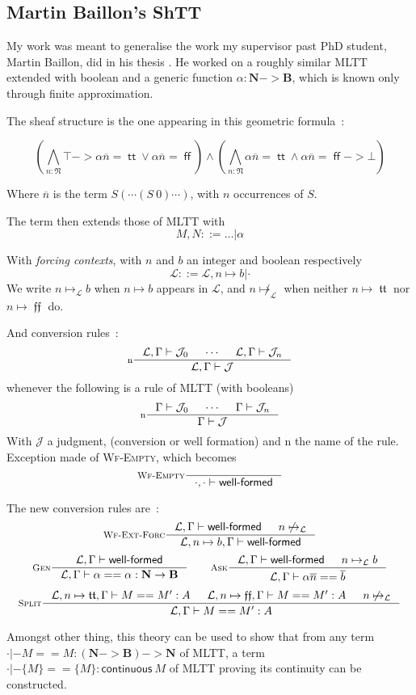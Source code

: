 \documentclass[11pt]{article}
\DeclareMathOperator{\true}{\mathsf{tt}}
\DeclareMathOperator{\false}{\mathsf{ff}}
\DeclareMathOperator{\mtrue}{\mathfrak{tt}}
\DeclareMathOperator{\mfalse}{\mathfrak{ff}}
\newcommand{\ovl}{\overline}
\newcommand{\0}{\mathbf{0}}
\newcommand{\1}{\mathbf{1}}
\newcommand{\nat}{\mathbf{N}}
\newcommand{\mnat}{\mathfrak{N}}
\newcommand{\bool}{\mathbf{B}}
\newcommand{\tctx}{\Gamma}
\newcommand{\Wf}{\textsf{well-formed}}
\newcommand{\fctx}{\mathcal{L}}
\begin{document}
\subsection{Martin Baillon's ShTT}\label{MBshtt}
My work was meant to generalise the work my supervisor past PhD student, Martin Baillon, did in his thesis \cite{baillon:tel-04617881}. He worked on a roughly similar MLTT extended with boolean and a generic function $\alpha: \nat -> \bool$, which is known only through finite approximation.

The sheaf structure is the one appearing in this geometric formula~:

$$ \left(\bigwedge_{n : \mnat} \top -> \alpha \ovl{n} = \true \vee \alpha \ovl{n} = \false\right) \wedge \left(\bigwedge_{n : \mnat} \alpha \ovl{n} = \true \wedge \alpha \ovl{n} = \false -> \bot \right)$$

Where $\ovl{n}$ is the term $S (\cdots (S\ 0)\cdots)$, with $n$ occurrences of $S$.

The term then extends those of MLTT with
$$ M, N ::= \dots |\alpha$$

With \emph{forcing contexts}, with $n$ and $b$ an integer and boolean respectively
$$ \fctx ::= \fctx, n \mapsto b | \cdot$$
We write $n\mapsto_\fctx b$ when $n\mapsto b$ appears in $\fctx$, and $n\not\mapsto_\fctx$ when neither $n\mapsto \mtrue$ nor $n\mapsto \mfalse$ do.

And conversion rules~:
$$
    \inference[n]{\fctx,\tctx |- \mathcal{J}_0 & \cdots & \fctx,\tctx |- \mathcal{J}_n}{\fctx,\tctx |- \mathcal{J}}
$$
whenever the following is a rule of MLTT (with booleans)
$$
    \inference[n]{\tctx |- \mathcal{J}_0 & \cdots & \tctx |- \mathcal{J}_n}{\tctx |- \mathcal{J}}
$$
With $\mathcal{J}$ a judgment, (conversion or well formation) and $\text{n}$ the name of the rule.
Exception made of \textsc{Wf-Empty}, which becomes
$$
    \inference[\textsc{Wf-Empty}]{}{\cdot,\cdot |- \Wf}
$$

The new conversion rules are~:
$$
    \inference[\textsc{Wf-Ext-Forc}]{\fctx,\tctx |- \Wf & n\not\mapsto_\fctx}{\fctx, n\mapsto b, \tctx |- \Wf}
$$
$$
    \inference[\textsc{Gen}]{\fctx,\tctx|- \Wf}{\fctx,\tctx |- \alpha == \alpha : \nat -> \bool}
    \qquad
    \inference[\textsc{Ask}]{\fctx,\tctx|- \Wf &n\mapsto_\fctx b}{\fctx, \tctx |- \alpha \ovl n == \ovl b}
$$
$$
    \inference[\textsc{Split}]{\fctx,n\mapsto \mtrue,\tctx |-M == M' :A & \fctx, n\mapsto\mfalse, \tctx |- M == M' : A & n\not\mapsto_\fctx}{\fctx,\tctx |- M == M' : A}
$$

Amongst other thing, this theory can be used to show that from any term $\cdot |- M == M : (\nat -> \bool) -> \nat$ of MLTT, a term $\cdot |- \{M\} == \{M\} : \mathsf{continuous}\ M$ of MLTT proving its continuity can be constructed.
\end{document}
